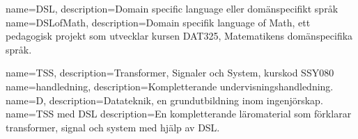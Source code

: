 {
    name=DSL,
    description={Domain specific language eller domänspecifikt språk}
}
{
    name=DSLofMath,
    description={Domain specifik language of Math, ett pedagogisk projekt som utvecklar kursen DAT325, Matematikens domänspecifika språk.}
}

{
    name=TSS,
    description={Transformer, Signaler och System, kurskod SSY080}
}
{
	name=handledning,
	description={Kompletterande undervisningshandledning.}
}
{
    name=D,
    description={Datateknik, en grundutbildning inom ingenjörskap.}
}
{
    name=TSS med DSL
    description={En kompletterande läromaterial som förklarar transformer, signal och system med hjälp av DSL.}
}